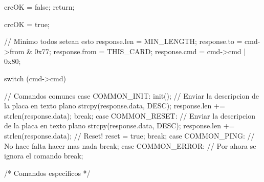 {\begin{verbatimtab}
{{		crcOK = false;
		return;
	}

	crcOK = true;
	
	// Minimo todos setean esto
	response.len = MIN_LENGTH;
	response.to = cmd->from & 0x77;
	response.from = THIS_CARD;
	response.cmd = cmd->cmd | 0x80;

	switch (cmd->cmd)
	{
		// Comandos comunes
		case COMMON_INIT:
			init();
			// Enviar la descripcion de la placa en texto plano
			strcpy(response.data, DESC);
			response.len += strlen(response.data);
		break;
		case COMMON_RESET:
			// Enviar la descripcion de la placa en texto plano
			strcpy(response.data, DESC);
			response.len += strlen(response.data);
			// Reset!
			reset = true;
		break;
		case COMMON_PING:
			// No hace falta hacer mas nada
		break;
 		case COMMON_ERROR:
			// Por ahora se ignora el comando
		break;
		
		/* Comandos especificos */

}}
\end{verbatimtab}}
